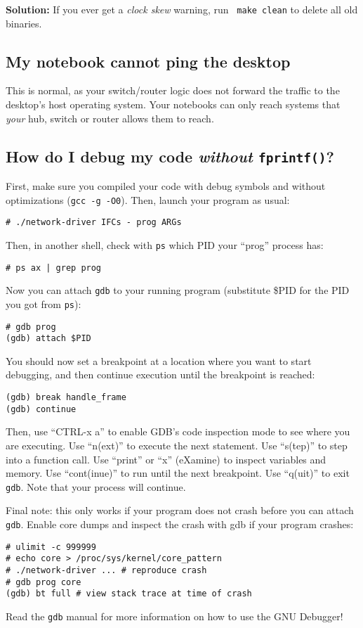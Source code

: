 \documentclass{article}
\begin{document}
{\bf Solution:} If you ever get a {\em clock skew} warning, run {\tt
  make clean} to delete all old binaries.


\subsection{My notebook cannot ping the desktop}

This is normal, as your switch/router logic does not forward the
traffic to the desktop's host operating system.  Your notebooks can
only reach systems that {\em your} hub, switch or router allows them
to reach.


\subsection{How do I debug my code {\em without} {\tt fprintf()}?}

First, make sure you compiled your code with debug symbols and
without optimizations ({\tt gcc -g -O0}).  Then, launch your program as usual:
\begin{verbatim}
# ./network-driver IFCs - prog ARGs
\end{verbatim}
Then, in another shell, check with {\tt ps} which PID your ``prog'' process has:
\begin{verbatim}
# ps ax | grep prog
\end{verbatim}
Now you can attach {\tt gdb} to your running program (substitute \$PID for the PID you got from {\tt ps}):
\begin{verbatim}
# gdb prog
(gdb) attach $PID
\end{verbatim}
You should now set a breakpoint at a location where you want to start debugging,
and then continue execution until the breakpoint is reached:
\begin{verbatim}
(gdb) break handle_frame
(gdb) continue
\end{verbatim}
Then, use ``CTRL-x a'' to enable GDB's code inspection mode to see where you are
executing.  Use ``n(ext)'' to execute the next statement. Use ``s(tep)'' to step
into a function call.  Use ``print'' or ``x'' (eXamine) to inspect variables and
memory.  Use ``cont(inue)'' to run until the next breakpoint. Use ``q(uit)'' to
exit {\tt gdb}. Note that your process will continue.

Final note: this only works if your program does not crash before you can attach
{\tt gdb}.  Enable core dumps and inspect the crash with gdb if your program
crashes:
\begin{verbatim}
# ulimit -c 999999
# echo core > /proc/sys/kernel/core_pattern
# ./network-driver ... # reproduce crash
# gdb prog core
(gdb) bt full # view stack trace at time of crash
\end{verbatim}
Read the {\tt gdb} manual for more information on how to use the GNU Debugger!
\end{document}
